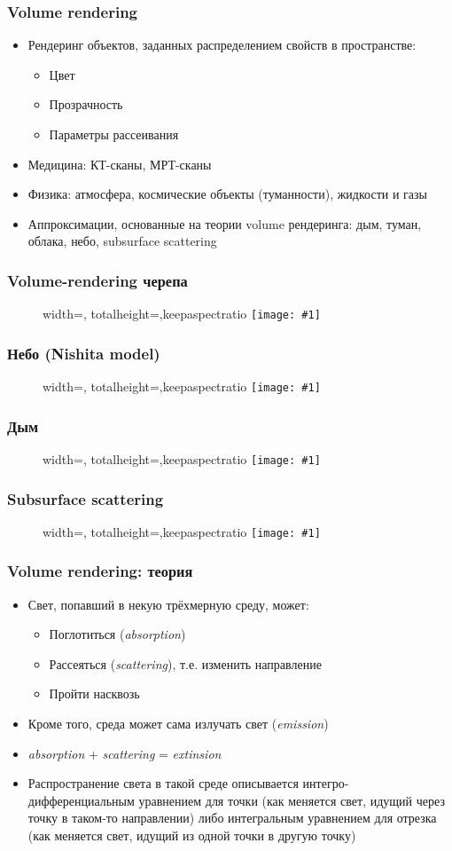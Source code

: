 \documentclass[10pt]{beamer}
\newcommand{\slideimage}[1]{
  \begin{figure}
    \begin{adjustbox}{width=\textwidth, totalheight=\textheight-2\baselineskip-2\baselineskip,keepaspectratio}
      \texttt{[image: \#1]}
    \end{adjustbox}
  \end{figure}
}
\begin{document}
\begin{frame}[fragile]
\frametitle{Volume rendering}
\begin{itemize}
\item Рендеринг объектов, заданных распределением свойств в пространстве:
\pause
\begin{itemize}
\item Цвет
\item Прозрачность
\item Параметры рассеивания
\end{itemize}
\pause
\item Медицина: КТ-сканы, МРТ-сканы
\item Физика: атмосфера, космические объекты (туманности), жидкости и газы
\item Аппроксимации, основанные на теории volume рендеринга: дым, туман, облака, небо, subsurface scattering
\end{itemize}
\end{frame}

\begin{frame}[fragile]
\frametitle{Volume-rendering черепа}
\slideimage{volume-skull.png}
\end{frame}

\begin{frame}[fragile]
\frametitle{Небо (Nishita model)}
\slideimage{sky.jpg}
\end{frame}

\begin{frame}[fragile]
\frametitle{Дым}
\slideimage{smoke.png}
\end{frame}

\begin{frame}[fragile]
\frametitle{Subsurface scattering}
\slideimage{subsurface.jpeg}
\end{frame}

\begin{frame}[fragile]
\frametitle{Volume rendering: теория}
\begin{itemize}
\item Свет, попавший в некую трёхмерную среду, может:
\pause
\begin{itemize}
\item Поглотиться (\textit{absorption})
\pause
\item Рассеяться (\textit{scattering}), т.е. изменить направление
\pause
\item Пройти насквозь
\end{itemize}
\pause
\item Кроме того, среда может сама излучать свет (\textit{emission})
\pause
\item \textit{absorption} + \textit{scattering} = \textit{extinsion}
\pause
\item Распространение света в такой среде описывается интегро-дифференциальным уравнением для точки (как меняется свет, идущий через точку в таком-то направлении) либо интегральным уравнением для отрезка (как меняется свет, идущий из одной точки в другую точку)
\end{itemize}
\end{frame}
\end{document}
